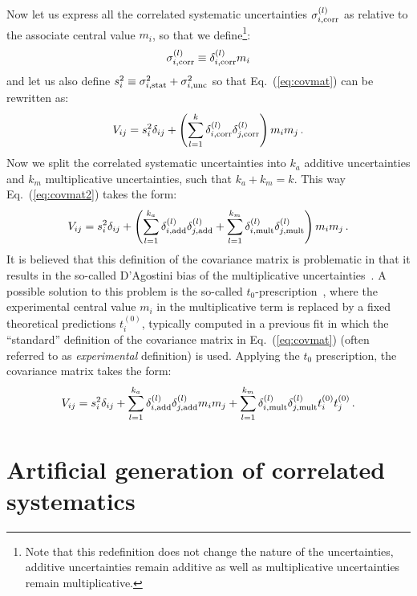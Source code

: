 \documentclass[10pt,a4paper]{article}
\begin{document}
Now let us express all the correlated systematic uncertainties
$\sigma_{i,\rm corr}^{(l)}$ as relative to the associate central value
$m_i$, so that we define\footnote{Note that this redefinition does not
  change the nature of the uncertainties, additive uncertainties
  remain additive as well as multiplicative uncertainties remain
  multiplicative.}:
\begin{equation}
\sigma_{i,\rm corr}^{(l)}\equiv  \delta_{i,\rm corr}^{(l)} m_i
\end{equation}
and let us also define
$s_i^2\equiv \sigma_{i,\rm stat}^2 +\sigma_{i,\rm unc}^2$ so that
Eq.~(\ref{eq:covmat}) can be rewritten as:
\begin{equation}\label{eq:covmat2}
  V_{ij}=s_i^2\delta_{ij} + \left(\sum_{l=1}^{k}\delta_{i,\rm
    corr}^{(l)}\delta_{j,\rm
    corr}^{(l)}\right)m_im_j\,.
\end{equation}
Now we split the correlated systematic uncertainties into $k_a$
additive uncertainties and $k_m$ multiplicative uncertainties, such
that $k_a+k_m=k$. This way Eq.~(\ref{eq:covmat2}) takes the form:
\begin{equation}\label{eq:covmat3}
  V_{ij}=s_i^2\delta_{ij} + \left(\sum_{l=1}^{k_a}\delta_{i,\rm
    add}^{(l)}\delta_{j,\rm
    add}^{(l)}+\sum_{l=1}^{k_m}\delta_{i,\rm
    mult}^{(l)}\delta_{j,\rm
    mult}^{(l)}\right)m_im_j\,.
\end{equation}
It is believed that this definition of the covariance matrix is
problematic in that it results in the so-called D'Agostini bias of the
multiplicative uncertainties~\cite{DAgostini:1993arp}. A possible
solution to this problem is the so-called
$t_0$-prescription~\cite{Ball:2009qv}, where the experimental central
value $m_i$ in the multiplicative term is replaced by a fixed
theoretical predictions $t_i^{(0)}$, typically computed in a previous
fit in which the ``standard'' definition of the covariance matrix in
Eq.~(\ref{eq:covmat}) (often referred to as \textit{experimental}
definition) is used. Applying the $t_0$ prescription, the covariance
matrix takes the form:
\begin{equation}\label{eq:covmat4}
  V_{ij}=s_i^2\delta_{ij} + \sum_{l=1}^{k_a}\delta_{i,\rm
    add}^{(l)}\delta_{j,\rm
    add}^{(l)}m_im_j+\sum_{l=1}^{k_m}\delta_{i,\rm
    mult}^{(l)}\delta_{j,\rm
    mult}^{(l)}t_i^{(0)}t_j^{(0)}\,.
\end{equation}

\section{Artificial generation of correlated systematics}
\end{document}
